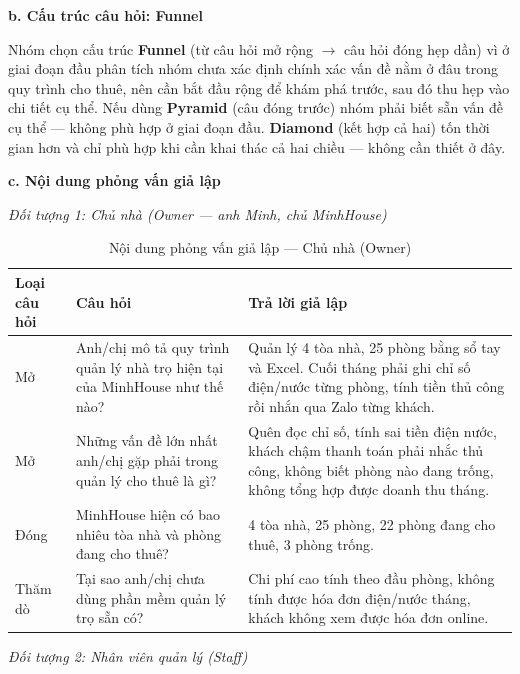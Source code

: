 \documentclass[12pt,a4paper]{report}
\begin{document}
\noindent\textbf{b. Cấu trúc câu hỏi: Funnel}

Nhóm chọn cấu trúc \textbf{Funnel} (từ câu hỏi mở rộng $\rightarrow$ câu hỏi đóng hẹp dần) vì ở giai đoạn đầu phân tích nhóm chưa xác định chính xác vấn đề nằm ở đâu trong quy trình cho thuê, nên cần bắt đầu rộng để khám phá trước, sau đó thu hẹp vào chi tiết cụ thể. Nếu dùng \textbf{Pyramid} (câu đóng trước) nhóm phải biết sẵn vấn đề cụ thể --- không phù hợp ở giai đoạn đầu. \textbf{Diamond} (kết hợp cả hai) tốn thời gian hơn và chỉ phù hợp khi cần khai thác cả hai chiều --- không cần thiết ở đây.

\noindent\textbf{c. Nội dung phỏng vấn giả lập}

\noindent\textit{Đối tượng 1: Chủ nhà (Owner --- anh Minh, chủ MinhHouse)}

\begin{table}[H]
  \centering
  \caption{Nội dung phỏng vấn giả lập --- Chủ nhà (Owner)}
  \label{tab:ig_int_owner}
  \begin{tabular}{@{}p{1.8cm}p{6cm}p{6.2cm}@{}}
    \toprule
    \textbf{Loại câu hỏi} & \textbf{Câu hỏi} & \textbf{Trả lời giả lập} \\
    \midrule
    Mở & Anh/chị mô tả quy trình quản lý nhà trọ hiện tại của MinhHouse như thế nào? & Quản lý 4 tòa nhà, 25 phòng bằng sổ tay và Excel. Cuối tháng phải ghi chỉ số điện/nước từng phòng, tính tiền thủ công rồi nhắn qua Zalo từng khách. \\
    \addlinespace
    Mở & Những vấn đề lớn nhất anh/chị gặp phải trong quản lý cho thuê là gì? & Quên đọc chỉ số, tính sai tiền điện nước, khách chậm thanh toán phải nhắc thủ công, không biết phòng nào đang trống, không tổng hợp được doanh thu tháng. \\
    \addlinespace
    Đóng & MinhHouse hiện có bao nhiêu tòa nhà và phòng đang cho thuê? & 4 tòa nhà, 25 phòng, 22 phòng đang cho thuê, 3 phòng trống. \\
    \addlinespace
    Thăm dò & Tại sao anh/chị chưa dùng phần mềm quản lý trọ sẵn có? & Chi phí cao tính theo đầu phòng, không tính được hóa đơn điện/nước tháng, khách không xem được hóa đơn online. \\
    \bottomrule
  \end{tabular}
\end{table}

\noindent\textit{Đối tượng 2: Nhân viên quản lý (Staff)}
\end{document}
